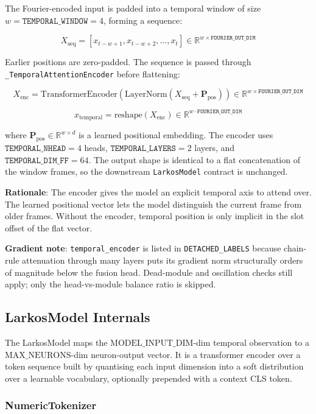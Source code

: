 \documentclass[12pt]{article}
\begin{document}
The Fourier-encoded input is padded into a temporal window of size
$w = \texttt{TEMPORAL\_WINDOW} = 4$, forming a sequence:

\[
  X_{\text{seq}} = [x_{t-w+1}, x_{t-w+2}, \ldots, x_t]
  \in \mathbb{R}^{w \times \texttt{FOURIER\_OUT\_DIM}}
\]

Earlier positions are zero-padded. The sequence is passed through
\texttt{\_TemporalAttentionEncoder} before flattening:

\[
  X_{\text{enc}} = \text{TransformerEncoder}
    \!\left(\text{LayerNorm}(X_{\text{seq}} + \mathbf{P}_{\text{pos}})\right)
  \in \mathbb{R}^{w \times \texttt{FOURIER\_OUT\_DIM}}
\]

\[
  x_{\text{temporal}} = \text{reshape}(X_{\text{enc}})
  \in \mathbb{R}^{w \cdot \texttt{FOURIER\_OUT\_DIM}}
\]

where $\mathbf{P}_{\text{pos}} \in \mathbb{R}^{w \times d}$ is a learned
positional embedding. The encoder uses $\texttt{TEMPORAL\_NHEAD}=4$ heads,
$\texttt{TEMPORAL\_LAYERS}=2$ layers, and $\texttt{TEMPORAL\_DIM\_FF}=64$.
The output shape is identical to a flat concatenation of the window frames,
so the downstream \texttt{LarkosModel} contract is unchanged.

\textbf{Rationale}: The encoder gives the model an explicit temporal axis
to attend over. The learned positional vector lets the model distinguish
the current frame from older frames. Without the encoder, temporal position
is only implicit in the slot offset of the flat vector.

\textbf{Gradient note}: \texttt{temporal\_encoder} is listed in
\texttt{DETACHED\_LABELS} because chain-rule attenuation through many
layers puts its gradient norm structurally orders of magnitude below the
fusion head. Dead-module and oscillation checks still apply; only the
head-vs-module balance ratio is skipped.

\subsection{LarkosModel Internals}

The LarkosModel maps the $\text{MODEL\_INPUT\_DIM}$-dim temporal
observation to a $\text{MAX\_NEURONS}$-dim neuron-output vector. It is
a transformer encoder over a token sequence built by quantising each
input dimension into a soft distribution over a learnable vocabulary,
optionally prepended with a context CLS token.

\subsubsection{NumericTokenizer}
\end{document}
